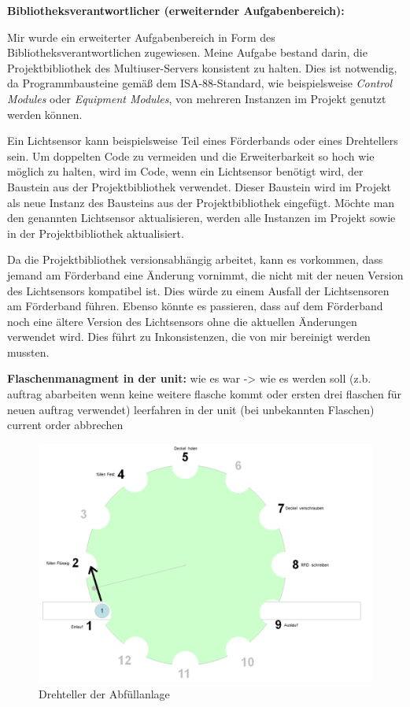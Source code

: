 \textbf{Bibliotheksverantwortlicher (erweiternder Aufgabenbereich):} 

Mir wurde ein erweiterter Aufgabenbereich in Form des Bibliotheksverantwortlichen zugewiesen. Meine Aufgabe bestand darin, 
die Projektbibliothek des Multiuser-Servers konsistent zu halten. Dies ist notwendig, da Programmbausteine gemäß dem 
ISA-88-Standard, wie beispielsweise \textit{Control Modules} oder \textit{Equipment Modules}, von mehreren Instanzen im 
Projekt genutzt werden können.

Ein Lichtsensor kann beispielsweise Teil eines Förderbands oder eines Drehtellers sein. Um doppelten Code zu vermeiden und 
die Erweiterbarkeit so hoch wie möglich zu halten, wird im Code, wenn ein Lichtsensor benötigt wird, der Baustein aus der 
Projektbibliothek verwendet. Dieser Baustein wird im Projekt als neue Instanz des Bausteins aus der Projektbibliothek 
eingefügt. Möchte man den genannten Lichtsensor aktualisieren, werden alle Instanzen im Projekt sowie in der 
Projektbibliothek aktualisiert.

Da die Projektbibliothek versionsabhängig arbeitet, kann es vorkommen, dass jemand am Förderband eine Änderung vornimmt, die 
nicht mit der neuen Version des Lichtsensors kompatibel ist. Dies würde zu einem Ausfall der Lichtsensoren am Förderband 
führen. Ebenso könnte es passieren, dass auf dem Förderband noch eine ältere Version des Lichtsensors ohne die aktuellen 
Änderungen verwendet wird. Dies führt zu Inkonsistenzen, die von mir bereinigt werden mussten.

\textbf{Flaschenmanagment in der unit:} 
wie es war -> wie es werden soll (z.b. auftrag abarbeiten wenn keine weitere flasche kommt oder ersten drei flaschen für neuen auftrag verwendet)
leerfahren in der unit (bei unbekannten Flaschen)
current order abbrechen 

\begin{figure}[h!]
    \centering
    \includegraphics{figures/image.png}
    \caption{Drehteller der Abfüllanlage\cite{siemens2022}} %
    \label{Drehteller} %
\end{figure}


